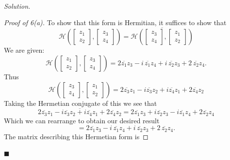 \documentclass[11pt]{article}
\theoremstyle{plain}
\theoremstyle{definition}
\newenvironment{solution}{%
  \par\noindent\textit{Solution.}\
}{%
  \hfill$\blacksquare$\par\bigskip
}
\newcommand{\Herm}{\mathcal{H}}
\begin{document}
\begin{solution}
  \begin{proof}[Proof of 6(a)]
    To show that this form is Hermitian, it suffices to show that
    \[
      \Herm\left(
        \begin{bmatrix}
          z_1 \\
          z_2
        \end{bmatrix},
        \begin{bmatrix}
          z_3 \\
          z_4
      \end{bmatrix}\right)=\overline{
        \Herm\left(
          \begin{bmatrix}
            z_3 \\
            z_4
          \end{bmatrix},
          \begin{bmatrix}
            z_1 \\
            z_2
        \end{bmatrix}\right)
      }
    \]
    We are given:
    \[
      \Herm\!\left(
        \begin{bmatrix} z_1 \\ z_2
        \end{bmatrix},
        \begin{bmatrix} z_3 \\ z_4
      \end{bmatrix}\right)
      = 2\overline{z_1} z_3 - i\,\overline{z_1} z_4
      + i\,\overline{z_2} z_3 + 2\,\overline{z_2} z_4.
    \]
    Thus
    \[
      \Herm\left(
        \begin{bmatrix}
          z_3 \\
          z_4
        \end{bmatrix},
        \begin{bmatrix}
          z_1 \\
          z_2
      \end{bmatrix}\right)= 2\overline{z_3}z_1 - i\overline{z_3}z_2
      + i\overline{z_4}z_1 + 2\overline{z_4}z_2
    \]
    Taking the Hermetian conjugate of this we see that
    \[
      \overline{2\overline{z_3}z_1 - i\overline{z_3}z_2
      + i\overline{z_4}z_1 + 2\overline{z_4}z_2} =
      2\overline{z_1}z_3 + i\overline{z_2}z_3 - i\overline{z_1}z_4 +
      2\overline{z_2}z_4
    \]
    Which we can rearrange to obtain our desired result
    \[
      = 2\overline{z_1} z_3 - i\,\overline{z_1} z_4
      + i\,\overline{z_2} z_3 + 2\,\overline{z_2} z_4.
    \]
    The matrix describing this Hermetian form is

\end{proof}
\end{solution}
\end{document}
